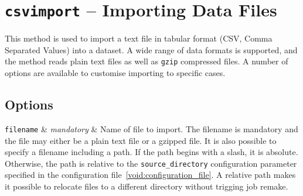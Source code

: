 
\section{\texttt{csvimport} -- Importing Data Files}

This method is used to import a text file in tabular format (CSV,
Comma Separated Values) into a dataset.  A wide range of data formats
is supported, and the method reads plain text files as well as
\texttt{gzip} compressed files.  A number of options are available to
customise importing to specific cases.


\subsection{Options}

\starttable
  \RP \texttt{filename} & \emph{mandatory} & Name of file to import.  The
  filename is mandatory and the file may either be a plain text file
  or a gzipped file.  It is also possible to specify a filename
  including a path.  If the path begins with a slash, it is absolute.
  Otherwise, the path is relative to the \texttt{source\_directory}
  configuration parameter specified in the configuration
  file~\ref{void:configuration_file}.  A relative path makes it
  possible to relocate files to a different directory without trigging
  job remake.\\
  
